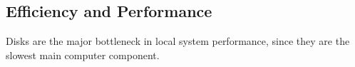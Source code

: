 \subsection{Efficiency and Performance}\label{subsec:Efficiency_Performance}
Disks are the major bottleneck in local system performance, since they are the slowest main computer component.


